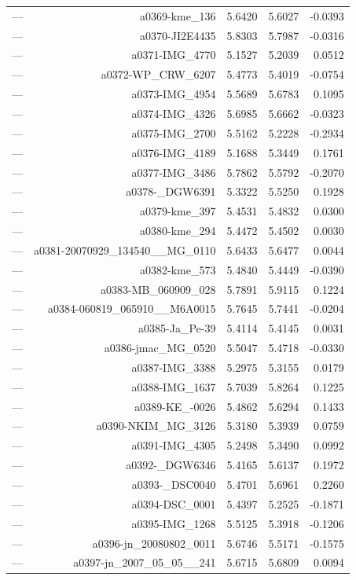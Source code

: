 \begin{table}[htbp]
\begin{tabular}{lrrrr}
— & a0369-kme_136 & 5.6420 & 5.6027 & -0.0393 \\
— & a0370-JI2E4435 & 5.8303 & 5.7987 & -0.0316 \\
— & a0371-IMG_4770 & 5.1527 & 5.2039 & 0.0512 \\
— & a0372-WP_CRW_6207 & 5.4773 & 5.4019 & -0.0754 \\
— & a0373-IMG_4954 & 5.5689 & 5.6783 & 0.1095 \\
— & a0374-IMG_4326 & 5.6985 & 5.6662 & -0.0323 \\
— & a0375-IMG_2700 & 5.5162 & 5.2228 & -0.2934 \\
— & a0376-IMG_4189 & 5.1688 & 5.3449 & 0.1761 \\
— & a0377-IMG_3486 & 5.7862 & 5.5792 & -0.2070 \\
— & a0378-_DGW6391 & 5.3322 & 5.5250 & 0.1928 \\
— & a0379-kme_397 & 5.4531 & 5.4832 & 0.0300 \\
— & a0380-kme_294 & 5.4472 & 5.4502 & 0.0030 \\
— & a0381-20070929_134540__MG_0110 & 5.6433 & 5.6477 & 0.0044 \\
— & a0382-kme_573 & 5.4840 & 5.4449 & -0.0390 \\
— & a0383-MB_060909_028 & 5.7891 & 5.9115 & 0.1224 \\
— & a0384-060819_065910__M6A0015 & 5.7645 & 5.7441 & -0.0204 \\
— & a0385-Ja_Pe-39 & 5.4114 & 5.4145 & 0.0031 \\
— & a0386-jmac_MG_0520 & 5.5047 & 5.4718 & -0.0330 \\
— & a0387-IMG_3388 & 5.2975 & 5.3155 & 0.0179 \\
— & a0388-IMG_1637 & 5.7039 & 5.8264 & 0.1225 \\
— & a0389-KE_-0026 & 5.4862 & 5.6294 & 0.1433 \\
— & a0390-NKIM_MG_3126 & 5.3180 & 5.3939 & 0.0759 \\
— & a0391-IMG_4305 & 5.2498 & 5.3490 & 0.0992 \\
— & a0392-_DGW6346 & 5.4165 & 5.6137 & 0.1972 \\
— & a0393-_DSC0040 & 5.4701 & 5.6961 & 0.2260 \\
— & a0394-DSC_0001 & 5.4397 & 5.2525 & -0.1871 \\
— & a0395-IMG_1268 & 5.5125 & 5.3918 & -0.1206 \\
— & a0396-jn_20080802_0011 & 5.6746 & 5.5171 & -0.1575 \\
— & a0397-jn_2007_05_05__241 & 5.6715 & 5.6809 & 0.0094 \\

\end{tabular}
\end{table}
